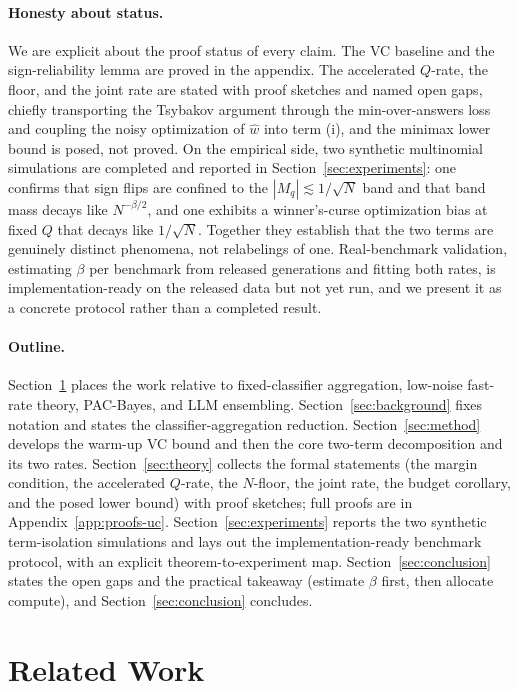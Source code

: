 \documentclass{article} %
\providecommand{\what}{\widehat{w}}
\begin{document}
\paragraph{Honesty about status.}
We are explicit about the proof status of every claim. The VC baseline and the
sign-reliability lemma are proved in the appendix. The accelerated $Q$-rate, the floor, and the joint rate are stated
with proof sketches and named open gaps, chiefly transporting the Tsybakov
argument through the min-over-answers loss and coupling the noisy optimization of
$\what$ into term (i), and the minimax lower bound is posed, not proved. On the
empirical side, two synthetic multinomial simulations are completed and reported
in Section~\ref{sec:experiments}: one confirms that sign flips are confined to the
$|M_q|\lesssim 1/\sqrt N$ band and that band mass decays like $N^{-\beta/2}$, and
one exhibits a winner's-curse optimization bias at fixed $Q$ that decays like
$1/\sqrt N$. Together they establish that the two terms are genuinely distinct
phenomena, not relabelings of one. Real-benchmark validation, estimating $\beta$
per benchmark from released generations and fitting both rates, is
implementation-ready on the released data but not yet run, and we present it as a
concrete protocol rather than a completed result.

\paragraph{Outline.}
Section~\ref{sec:related} places the work relative to fixed-classifier aggregation,
low-noise fast-rate theory, PAC-Bayes, and LLM ensembling.
Section~\ref{sec:background} fixes notation and states the classifier-aggregation
reduction. Section~\ref{sec:method} develops the warm-up VC bound and then the core
two-term decomposition and its two rates. Section~\ref{sec:theory} collects the
formal statements (the margin condition, the accelerated $Q$-rate, the $N$-floor,
the joint rate, the budget corollary, and the posed lower bound) with proof
sketches; full proofs are in Appendix~\ref{app:proofs-uc}.
Section~\ref{sec:experiments} reports the two synthetic term-isolation
simulations and lays out the implementation-ready benchmark protocol, with an
explicit theorem-to-experiment map. Section~\ref{sec:conclusion} states the
open gaps and the practical takeaway (estimate $\beta$ first, then allocate
compute), and Section~\ref{sec:conclusion} concludes.


\section{Related Work}
\label{sec:related}
\end{document}

